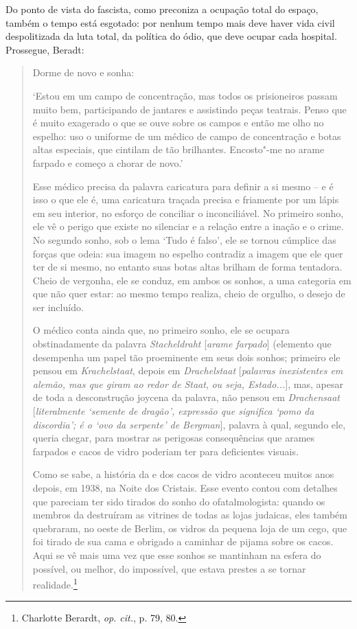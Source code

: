Do ponto de vista do fascista, como preconiza a ocupação total do
espaço, também o tempo está esgotado: por nenhum tempo mais deve haver
vida civil despolitizada da luta total, da política do ódio, que deve
ocupar cada hospital. Prossegue, Beradt:

\bigskip

\begin{quote}
Dorme de novo e sonha:

`Estou em um campo de concentração, mas todos os prisioneiros passam
muito bem, participando de jantares e assistindo peças teatrais. Penso
que é muito exagerado o que se ouve sobre os campos e então me olho no
espelho: uso o uniforme de um médico de campo de concentração e botas
altas especiais, que cintilam de tão brilhantes. Encosto"-me no arame
farpado e começo a chorar de novo.'

Esse médico precisa da palavra caricatura para definir a si mesmo -- e é
isso o que ele é, uma caricatura traçada precisa e friamente por um
lápis em seu interior, no esforço de conciliar o inconciliável. No
primeiro sonho, ele vê o perigo que existe no silenciar e a relação
entre a inação e o crime. No segundo sonho, sob o lema `Tudo é falso',
ele se tornou cúmplice das forças que odeia: sua imagem no espelho
contradiz a imagem que ele quer ter de si mesmo, no entanto suas botas
altas brilham de forma tentadora. Cheio de vergonha, ele se conduz, em
ambos os sonhos, a uma categoria em que não quer estar: ao mesmo tempo
realiza, cheio de orgulho, o desejo de ser incluído.

O médico conta ainda que, no primeiro sonho, ele se ocupara
obstinadamente da palavra \emph{Stacheldraht} {[}\emph{arame farpado}{]}
(elemento que desempenha um papel tão proeminente em seus dois sonhos;
primeiro ele pensou em \emph{Krachelstaat}, depois em
\emph{Drachelstaat} {[}\emph{palavras inexistentes em alemão, mas que
giram ao redor de Staat}, \emph{ou seja, Estado...}{]}, mas, apesar de
toda a desconstrução joycena da palavra, não pensou em
\emph{Drachensaat} {[}\emph{literalmente `semente de dragão', expressão
que significa `pomo da discordia'; é o `ovo da serpente' de Bergman}{]},
palavra à qual, segundo ele, queria chegar, para mostrar as perigosas
consequências que arames farpados e cacos de vidro poderiam ter para
deficientes visuais.

Como se sabe, a história da  e dos cacos de vidro aconteceu muitos
anos depois, em 1938, na Noite dos Cristais. Esse evento contou com
detalhes que pareciam ter sido tirados do sonho do ofatalmologista:
quando os membros da  destruíram as vitrines de todas as lojas
judaicas, eles também quebraram, no oeste de Berlim, os vidros da
pequena loja de um cego, que foi tirado de sua cama e obrigado a
caminhar de pijama sobre os cacos. Aqui se vê mais uma vez que esse
sonhos se mantinham na esfera do possível, ou melhor, do impossível, que
estava prestes a se tornar realidade.\footnote{Charlotte Berardt,
  \emph{op. cit.}, p. 79, 80.}
  \end{quote}

